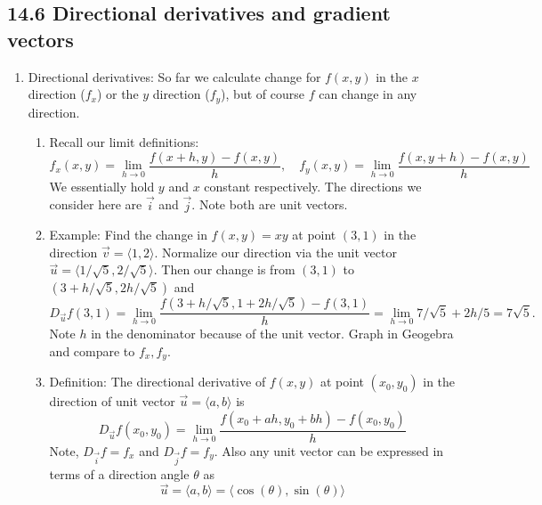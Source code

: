 \documentclass{article}
\begin{document}
\subsection{14.6 Directional derivatives and gradient vectors}
\begin{enumerate}

\item Directional derivatives: So far we calculate change for $f(x,y)$ in the $x$ direction ($f_x$) or the $y$ direction ($f_y$), but of course $f$ can change in any direction.
\begin{enumerate}
\item Recall our limit definitions:
\[
f_x(x,y) = \lim_{h \rightarrow 0} \frac{f(x+h,y)-f(x,y)}{h}, \quad
f_y(x,y) = \lim_{h \rightarrow 0} \frac{f(x,y+h)-f(x,y)}{h}
\]
We essentially hold $y$ and $x$ constant respectively. The directions we consider here are $\vec{i}$ and $\vec{j}$. Note both are unit vectors.
\item Example: Find the change in $f(x,y)=xy$ at point $(3,1)$ in the direction $\vec{v}=\langle 1,2 \rangle$. Normalize our direction via the unit vector $\vec{u} = \langle 1/\sqrt{5}, 2/\sqrt{5} \rangle$. Then our change is from $(3,1)$ to $(3+h/\sqrt{5}, 2h/\sqrt{5})$ and
\[
D_{\vec{u}} f(3,1) = \lim_{h \rightarrow 0} \frac{f(3+h/\sqrt{5}, 1+2h/\sqrt{5})-f(3,1)}{h} =  \lim_{h \rightarrow 0} 7/\sqrt{5}+2h/5 = 7\sqrt{5}.
\]
Note $h$ in the denominator because of the unit vector. Graph in Geogebra and compare to $f_x, f_y$.
\item Definition: The directional derivative of $f(x,y)$ at point $(x_0,y_0)$ in the direction of unit vector $\vec{u}=\langle a,b \rangle$ is 
\[
D_{\vec{u}} f(x_0, y_0) = \lim_{h \rightarrow 0} \frac{f(x_0+ah, y_0+bh)-f(x_0,y_0)}{h} 
\]
Note, $D_{\vec{i}} f = f_x$ and $D_{\vec{j}} f = f_y$. Also any unit vector can be expressed in terms of a direction angle $\theta$ as
\[
\vec{u} = \langle a,b \rangle = \langle \cos(\theta), \sin(\theta) \rangle
\]
\end{enumerate}


\end{enumerate}
\end{document}

